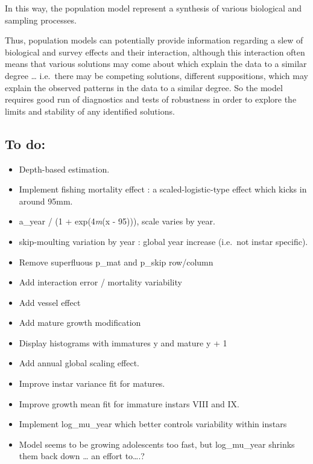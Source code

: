 \documentclass[
]{article}
\begin{document}
In this way, the population model represent a synthesis of various
biological and sampling processes.

Thus, population models can potentially provide information regarding a
slew of biological and survey effects and their interaction, although
this interaction often means that various solutions may come about which
explain the data to a similar degree \ldots{} i.e.~there may be
competing solutions, different suppositions, which may explain the
observed patterns in the data to a similar degree. So the model requires
good run of diagnostics and tests of robustness in order to explore the
limits and stability of any identified solutions.

\hypertarget{to-do}{%
\subsection{To do:}\label{to-do}}

\begin{itemize}
\item
  Depth-based estimation.
\item
  Implement fishing mortality effect : a scaled-logistic-type effect
  which kicks in around 95mm.
\item
  a\_year / (1 + exp(4\emph{m}(x - 95))), scale varies by year.
\item
  skip-moulting variation by year : global year increase (i.e.~not
  instar specific).
\item
  Remove superfluous p\_mat and p\_skip row/column
\item
  Add interaction error / mortality variability
\item
  Add vessel effect
\item
  Add mature growth modification\\
\item
  Display histograms with immatures y and mature y + 1
\item
  Add annual global scaling effect.
\item
  Improve instar variance fit for matures.
\item
  Improve growth mean fit for immature instars VIII and IX.
\item
  Implement log\_mu\_year which better controls variability within
  instars
\item
  Model seems to be growing adolescents too fast, but log\_mu\_year
  shrinks them back down \ldots{} an effort to\ldots.?
\end{itemize}
\end{document}
